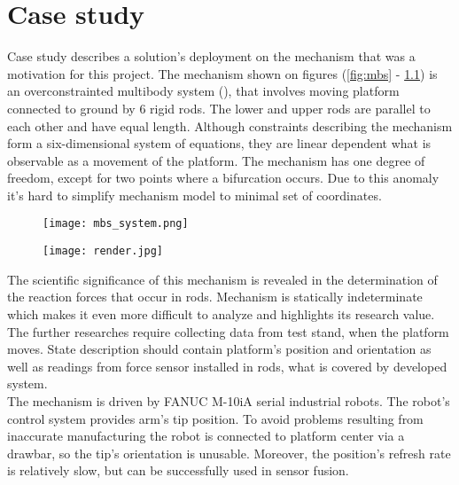 \chapter{Case study}


Case study describes a solution's deployment on the mechanism that was a motivation for this project. The mechanism shown on figures (\ref{fig:mbs} - \ref{fig:render}) is an overconstrainted multibody system (\cite{bib:BPAS2012}), that involves moving platform connected to ground by 6 rigid rods. The lower and upper rods are parallel to each other and have equal length. Although constraints describing the mechanism form a six-dimensional system of equations, they are linear dependent what is observable as a movement of the platform. The mechanism has one degree of freedom, except for two points where a bifurcation occurs. Due to this anomaly it's hard to simplify mechanism model to minimal set of coordinates.

\begin{figure}[!h]
	\centering
	\begin{minipage}{.5\textwidth}
		\centering
		\texttt{[image: mbs\_system.png]}
		\label{fig:mbs}
	\end{minipage}%
	\begin{minipage}{.5\textwidth}
		\centering
		\texttt{[image: render.jpg]}
		\label{fig:render}
	\end{minipage}
\end{figure}

The scientific significance of this mechanism is revealed in the determination of the reaction forces that occur in rods. Mechanism is statically indeterminate which makes it even more difficult to analyze and highlights its research value. The further researches require collecting data from test stand, when the platform moves. State description should contain platform's position and orientation as well as readings from force sensor installed in rods, what is covered by developed system.\\

The mechanism is driven by FANUC M-10iA serial industrial robots. The robot's control system provides arm's tip position. To avoid problems resulting from inaccurate manufacturing the robot is connected to platform center via a drawbar, so the tip's orientation is unusable. Moreover, the position's refresh rate is relatively slow, but can be successfully used in sensor fusion.\\

